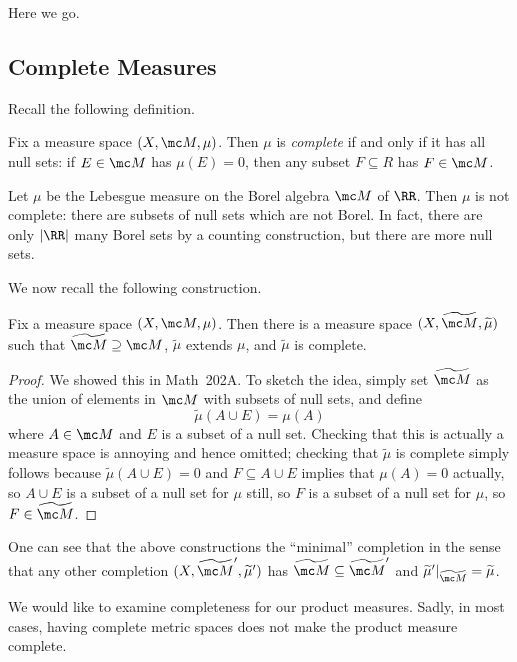 \documentclass[../notes.tex]{subfiles}
\begin{document}
Here we go.

\subsection{Complete Measures}
Recall the following definition.
\begin{definition}[complete]
	Fix a measure space $(X,\mc M,\mu)$. Then $\mu$ is \textit{complete} if and only if it has all null sets: if $E\in\mc M$ has $\mu(E)=0$, then any subset $F\subseteq R$ has $F\in\mc M$.
\end{definition}
\begin{nex}
	Let $\mu$ be the Lebesgue measure on the Borel algebra $\mc M$ of $\RR$. Then $\mu$ is not complete: there are subsets of null sets which are not Borel. In fact, there are only $\left|\RR\right|$ many Borel sets by a counting construction, but there are more null sets.
\end{nex}
We now recall the following construction.
\begin{proposition}
	Fix a measure space $(X,\mc M,\mu)$. Then there is a measure space $(X,\widetilde{\mc M},\widetilde\mu)$ such that $\widetilde{\mc M}\supseteq\mc M$, $\widetilde\mu$ extends $\mu$, and $\widetilde\mu$ is complete.
\end{proposition}
\begin{proof}
	We showed this in Math~202A. To sketch the idea, simply set $\widetilde{\mc M}$ as the union of elements in $\mc M$ with subsets of null sets, and define
	\[\widetilde\mu(A\cup E)=\mu(A)\]
	where $A\in\mc M$ and $E$ is a subset of a null set. Checking that this is actually a measure space is annoying and hence omitted; checking that $\widetilde\mu$ is complete simply follows because $\widetilde\mu(A\cup E)=0$ and $F\subseteq A\cup E$ implies that $\mu(A)=0$ actually, so $A\cup E$ is a subset of a null set for $\mu$ still, so $F$ is a subset of a null set for $\mu$, so $F\in\widetilde{\mc M}$.
\end{proof}
\begin{remark}
	One can see that the above constructions the ``minimal'' completion in the sense that any other completion $(X,\widetilde{\mc M}',\widetilde\mu')$ has $\widetilde{\mc M}\subseteq\widetilde{\mc M}'$ and $\widetilde\mu'|_{\widetilde{\mc M}}=\widetilde\mu$.
\end{remark}
We would like to examine completeness for our product measures. Sadly, in most cases, having complete metric spaces does not make the product measure complete.
\end{document}
